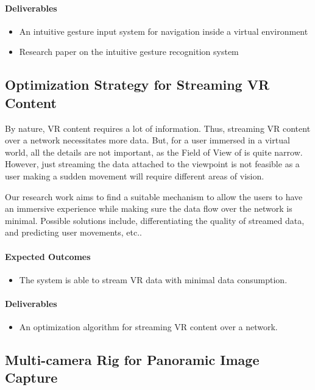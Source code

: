 \paragraph{\textbf{Deliverables}}
\begin{itemize}
\item{An intuitive gesture input system for navigation inside a virtual environment}
\item{Research paper on the intuitive gesture recognition system}
\end{itemize}

\subsection{Optimization Strategy for Streaming VR Content}
\label{intro_subsec:3_5}

By nature, VR content requires a lot of information. Thus, streaming VR content over a network necessitates more data. But, for a user immersed in a virtual world, all the details are not important, as the Field of View of is quite narrow. However, just streaming the data attached to the viewpoint is not feasible as a user making a sudden movement will require different areas of vision.

Our research work aims to find a suitable mechanism to allow the users to have an immersive experience while making sure the data flow over the network is minimal. Possible solutions include, differentiating the quality of streamed data, and predicting user movements, etc..

\paragraph{\textbf{Expected Outcomes}}
\begin{itemize}
\item{The system is able to stream VR data with minimal data consumption.}
\end{itemize}

\paragraph{\textbf{Deliverables}}
\begin{itemize}
\item{An optimization algorithm for streaming VR content over a network.}
\end{itemize}

\subsection{Multi-camera Rig for Panoramic Image Capture}
\label{intro_subsec:3_6}


